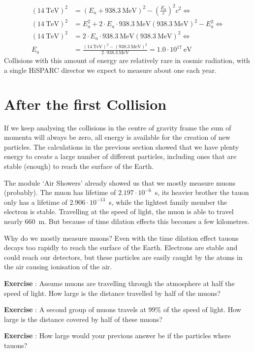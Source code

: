 \documentclass[12pt,a4paper]{article}
\numberwithin{equation}{section}
\numberwithin{figure}{section}
\newcounter{Exercise}
\numberwithin{table}{section}
\begin{document}
\begin{align}
\left( 14~\mbox{TeV} \right)^2 &= \left( E_a + 938.3~\mbox{MeV} \right)^2 - \left( \frac{E_a}{c} \right)^2 c^2 \Longleftrightarrow \\
\left( 14~\mbox{TeV} \right)^2 &= E_a^2 + 2 \cdot E_a \cdot 938.3~\mbox{MeV} \left( 938.3~\mbox{MeV} \right)^2 -E^2_a \Longleftrightarrow \\
\left( 14~\mbox{TeV} \right)^2 &= 2 \cdot E_a \cdot 938.3~\mbox{MeV} \left( 938.3~\mbox{MeV} \right)^2 \Longleftrightarrow \\
E_a &= \frac{\left( 14~\mbox{TeV} \right)^2 -\left( 938.3~\mbox{MeV} \right)^2 }{2 \cdot 938.3~\mbox{MeV}} = 1.0 \cdot 10^{17}~\mbox{eV}
\end{align}
Collisions with this amount of energy are relatively rare in cosmic radiation, with a single HiSPARC director we expect to measure about one each year.

\section{After the first Collision}
If we keep analysing the collisions in the centre of gravity frame the sum of momenta will always be zero, all energy is available for the creation of new particles. The calculations in the previous section showed that we have plenty energy to create a large number of different particles, including ones that are stable (enough) to reach the surface of the Earth.

The module `Air Showers' already showed us that we mostly measure muons (probably). The muon has lifetime of $2.197 \cdot 10^{-6}$~s, its heavier brother the tauon only has a lifetime of $2.906 \cdot 10^{-13}$~s, while the lightest family member the electron is stable. Travelling at the speed of light, the muon is able to travel nearly 660~m. But because of time dilation effects this becomes a few kilometres.

Why do we mostly measure muons? Even with the time dilation effect tauons decays too rapidly to reach the surface of the Earth. Electrons are stable and could reach our detectors, but these particles are easily caught by the atoms in the air causing ionisation of the air.


\begin{shaded}
\textbf{Exercise \theExercise {}} : Assume muons are travelling through the atmosphere at half the speed of light. How large is the distance travelled by half of the muons?\end{shaded}
\begin{shaded}
\textbf{Exercise \theExercise {}} : A second group of muons travels at 99\% of the speed of light. How large is the distance covered by half of these muons?\end{shaded}
\begin{shaded}
\textbf{Exercise \theExercise {}} : How large would your previous answer be if the particles where tauons?\end{shaded}
\end{document}
